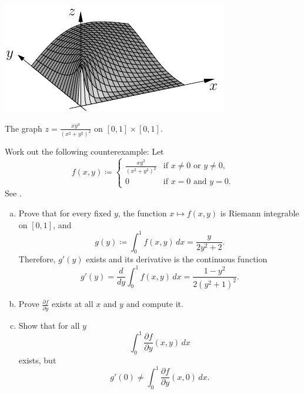 \begin{myfigureht}
\includegraphics{figures/diffunderex916}
\caption{The graph $z= \frac{xy^3}{{(x^2+y^2)}^2}$ on
$[0,1] \times [0,1]$.\label{fig:diffunderex916}}
\end{myfigureht}

\begin{exercise}
\pagebreak[2]
Work out the following counterexample:  Let
\begin{equation*}
f(x,y) \coloneqq
\begin{cases}
\frac{xy^3}{{(x^2+y^2)}^2} & \text{if } x\not=0 \text{ or } y\not= 0, \\
0                          & \text{if } x=0 \text{ and } y=0.
\end{cases}
\end{equation*}
See .
\begin{enumerate}[a)]
\item
Prove that for every fixed $y$, the function $x \mapsto f(x,y)$ is
Riemann integrable on $[0,1]$, and
\begin{equation*}
g(y) \coloneqq \int_0^1 f(x,y) \, dx = \frac{y}{2y^2+2} .
\end{equation*}
Therefore, $g'(y)$ exists and its derivative is the continuous function
\begin{equation*}
g'(y) =
\frac{d}{dy} \int_0^1 f(x,y) \, dx
=
\frac{1-y^2}{2{(y^2+1)}^2} .
\end{equation*}
\item
Prove $\frac{\partial f}{\partial y}$ exists at all $x$ and $y$ and
compute it.
\item
Show that for all $y$
\begin{equation*}
\int_0^1 \frac{\partial f}{\partial y} (x,y) \, dx
\end{equation*}
exists, but
\begin{equation*}
g'(0) \not= \int_0^1 \frac{\partial f}{\partial y} (x,0) \, dx .
\end{equation*}
\end{enumerate}
\end{exercise}

